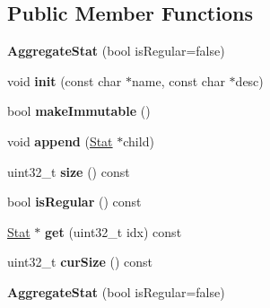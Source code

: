 \subsection*{Public Member Functions}
\begin{DoxyCompactItemize}
\item 
\hypertarget{classAggregateStat_a4f69488195511be076a792bd6b4bb4d3}{{\bfseries Aggregate\-Stat} (bool is\-Regular=false)}\label{classAggregateStat_a4f69488195511be076a792bd6b4bb4d3}

\item 
\hypertarget{classAggregateStat_a5a872e7b0af5362eaae6b304fef84238}{void {\bfseries init} (const char $\ast$name, const char $\ast$desc)}\label{classAggregateStat_a5a872e7b0af5362eaae6b304fef84238}

\item 
\hypertarget{classAggregateStat_ab2265e46065d4664f3f4507a8c3691b1}{bool {\bfseries make\-Immutable} ()}\label{classAggregateStat_ab2265e46065d4664f3f4507a8c3691b1}

\item 
\hypertarget{classAggregateStat_af4f3bbb6a336b481299b936ddcced4cb}{void {\bfseries append} (\hyperlink{classStat}{Stat} $\ast$child)}\label{classAggregateStat_af4f3bbb6a336b481299b936ddcced4cb}

\item 
\hypertarget{classAggregateStat_a20e9df9e5246b41edd111b5088118d8a}{uint32\-\_\-t {\bfseries size} () const }\label{classAggregateStat_a20e9df9e5246b41edd111b5088118d8a}

\item 
\hypertarget{classAggregateStat_a0ecf5b1c93991c7d5c5cc4fa2c07287c}{bool {\bfseries is\-Regular} () const }\label{classAggregateStat_a0ecf5b1c93991c7d5c5cc4fa2c07287c}

\item 
\hypertarget{classAggregateStat_a52c0cebe85e6e2f147329a3f3ad771a7}{\hyperlink{classStat}{Stat} $\ast$ {\bfseries get} (uint32\-\_\-t idx) const }\label{classAggregateStat_a52c0cebe85e6e2f147329a3f3ad771a7}

\item 
\hypertarget{classAggregateStat_a79cb6a42f80d59c331cba872eff8d6ff}{uint32\-\_\-t {\bfseries cur\-Size} () const }\label{classAggregateStat_a79cb6a42f80d59c331cba872eff8d6ff}

\item 
\hypertarget{classAggregateStat_a4f69488195511be076a792bd6b4bb4d3}{{\bfseries Aggregate\-Stat} (bool is\-Regular=false)}\label{classAggregateStat_a4f69488195511be076a792bd6b4bb4d3}


\end{DoxyCompactItemize}
